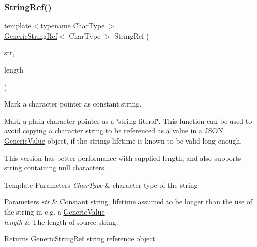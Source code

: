 \subsubsection{\texorpdfstring{String\+Ref()}{StringRef()}\hspace{0.1cm}{\footnotesize\ttfamily [2/2]}}
{\footnotesize\ttfamily template$<$typename Char\+Type $>$ \\
\hyperlink{a02008}{Generic\+String\+Ref}$<$ Char\+Type $>$ String\+Ref (\begin{DoxyParamCaption}\item[{const Char\+Type $\ast$}]{str,  }\item[{size\+\_\+t}]{length }\end{DoxyParamCaption})\hspace{0.3cm}{\ttfamily [inline]}}



Mark a character pointer as constant string. 

Mark a plain character pointer as a \char`\"{}string literal\char`\"{}. This function can be used to avoid copying a character string to be referenced as a value in a J\+S\+ON \hyperlink{a01992}{Generic\+Value} object, if the string\textquotesingle{}s lifetime is known to be valid long enough.

This version has better performance with supplied length, and also supports string containing null characters.


\begin{DoxyTemplParams}{Template Parameters}
{\em Char\+Type} & character type of the string \\
\hline
\end{DoxyTemplParams}

\begin{DoxyParams}{Parameters}
{\em str} & Constant string, lifetime assumed to be longer than the use of the string in e.\+g. a \hyperlink{a01992}{Generic\+Value} \\
\hline
{\em length} & The length of source string. \\
\hline
\end{DoxyParams}
\begin{DoxyReturn}{Returns}
\hyperlink{a02008}{Generic\+String\+Ref} string reference object 
\end{DoxyReturn}
